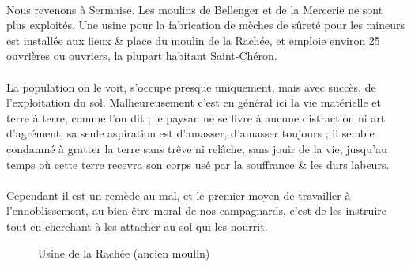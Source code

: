 \documentclass[../eBook.tex]{subfiles}
\begin{document}
    \vspace{12pt}
    \noindent\dotfill
    \paragraph{}Nous revenons à Sermaise. Les moulins de Bellenger et de la Mercerie ne sont plus exploités. Une usine pour la fabrication de mèches de sûreté pour les mineurs est installée aux lieux \& place du moulin de la Rachée, et emploie environ 25 ouvrières ou ouvriers, la plupart habitant Saint-Chéron.
    \paragraph{}La population on le voit, s'occupe presque uniquement, mais avec succès, de l'exploitation du sol. Malheureusement c'est en général ici la vie matérielle et terre à terre, comme l'on dit ; le paysan ne se livre à aucune distraction ni art d'agrément, sa seule aspiration est d'amasser, d'amasser toujours ; il semble condamné à gratter la terre sans trêve ni relâche, sans jouir de la vie, jusqu'au temps où cette terre recevra son corps usé par la souffrance \& les durs labeurs.
    \paragraph{}Cependant il est un remède au mal, et le premier moyen de travailler à l'ennoblissement, au bien-être moral de nos campagnards, c'est de les instruire tout en cherchant à les attacher au sol qui les nourrit.
    \newpage
    \begin{center}
      \begin{figure}[!ht]
        \caption*{Usine de la Rachée (ancien moulin)}
      \end{figure}
    \end{center}
    \vspace*{\fill}
\end{document}
